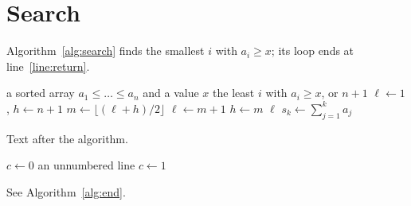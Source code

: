 \documentclass{article}
\begin{document}
\section{Search}
Algorithm~\ref{alg:search} finds the smallest $i$ with $a_i \ge x$; its
loop ends at line~\ref{line:return}.
\begin{algorithm}
\caption{Binary search}\label{alg:search}
\begin{algorithmic}[1]
\Require a sorted array $a_1 \le \dots \le a_n$ and a value $x$
\Ensure the least $i$ with $a_i \ge x$, or $n+1$
  \State $\ell \gets 1$, $h \gets n + 1$ 
    \State $m \gets \lfloor (\ell + h)/2 \rfloor$
      \State $\ell \gets m + 1$ 
    \Else
      \State $h \gets m$
    \EndIf
  \EndWhile
  \State \Return $\ell$\label{line:return}
\EndFunction
{}
  \State $s_k \gets \sum_{j=1}^{k} a_j$
\EndFor
\end{algorithmic}
\end{algorithm}
Text after the algorithm.

\begin{algorithm}[H]
\begin{algorithmic}
\State $c \gets 0$
\Statex an unnumbered line
  \State $c \gets 1$
\EndIf
\end{algorithmic}
\caption{A caption at the end, an \texttt{[H]} float}\label{alg:end}
\end{algorithm}
See Algorithm~\ref{alg:end}.
\end{document}
